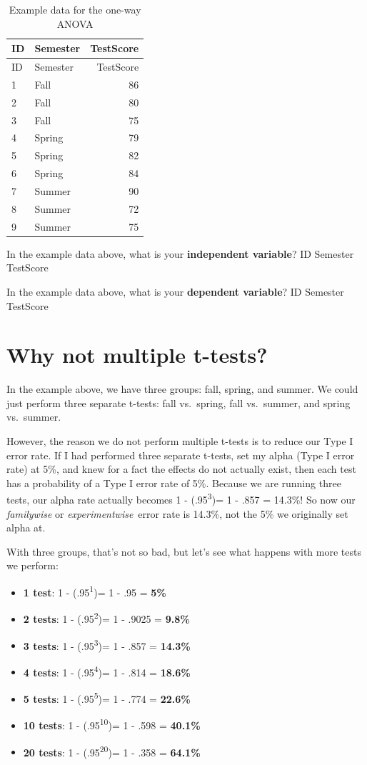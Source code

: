 \documentclass[
]{book}
\providecommand{\tightlist}{%
  \setlength{\itemsep}{0pt}\setlength{\parskip}{0pt}}
\begin{document}
\begin{longtable}[]{@{}llr@{}}
\caption{Example data for the one-way ANOVA}\tabularnewline
\toprule
ID & Semester & TestScore\tabularnewline
\midrule
\endfirsthead
\toprule
ID & Semester & TestScore\tabularnewline
\midrule
\endhead
1 & Fall & 86\tabularnewline
2 & Fall & 80\tabularnewline
3 & Fall & 75\tabularnewline
4 & Spring & 79\tabularnewline
5 & Spring & 82\tabularnewline
6 & Spring & 84\tabularnewline
7 & Summer & 90\tabularnewline
8 & Summer & 72\tabularnewline
9 & Summer & 75\tabularnewline
\bottomrule
\end{longtable}

In the example data above, what is your \textbf{independent variable}? ID Semester TestScore

In the example data above, what is your \textbf{dependent variable}? ID Semester TestScore

\hypertarget{why-not-multiple-t-tests}{%
\section{Why not multiple t-tests?}\label{why-not-multiple-t-tests}}

In the example above, we have three groups: fall, spring, and summer. We could just perform three separate t-tests: fall vs.~spring, fall vs.~summer, and spring vs.~summer.

However, the reason we do not perform multiple t-tests is to reduce our Type I error rate. If I had performed three separate t-tests, set my alpha (Type I error rate) at 5\%, and knew for a fact the effects do not actually exist, then each test has a probability of a Type I error rate of 5\%. Because we are running three tests, our alpha rate actually becomes 1 - (.95\textsuperscript{3})= 1 - .857 = 14.3\%! So now our \emph{familywise} or \emph{experimentwise}~error rate is 14.3\%, not the 5\% we originally set alpha at.

With three groups, that's not so bad, but let's see what happens with more tests we perform:

\begin{itemize}
\tightlist
\item
  \textbf{1 test}: 1 - (.95\textsuperscript{1})= 1 - .95 = \textbf{5\%}
\item
  \textbf{2 tests}: 1 - (.95\textsuperscript{2})= 1 - .9025 = \textbf{9.8\%}
\item
  \textbf{3 tests}: 1 - (.95\textsuperscript{3})= 1 - .857 = \textbf{14.3\%}
\item
  \textbf{4 tests}: 1 - (.95\textsuperscript{4})= 1 - .814 = \textbf{18.6\%}
\item
  \textbf{5 tests}: 1 - (.95\textsuperscript{5})= 1 - .774 = \textbf{22.6\%}
\item
  \textbf{10 tests}: 1 - (.95\textsuperscript{10})= 1 - .598 = \textbf{40.1\%}
\item
  \textbf{20 tests}: 1 - (.95\textsuperscript{20})= 1 - .358 = \textbf{64.1\%}
\end{itemize}
\end{document}
